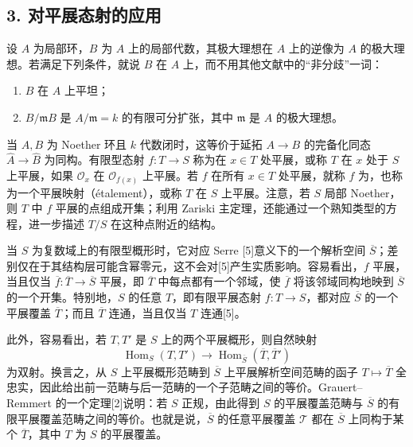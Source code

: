 \subsection*{3. 对平展态射的应用}
设 $A$ 为局部环，$B$ 为 $A$ 上的局部代数，其极大理想在 $A$ 上的逆像为 $A$ 的极大理想。若满足下列条件，就说 $B$ 在 $A$ 上，而不用其他文献中的“非分歧”一词：
\begin{enumerate}[label=(\roman*)]
\item $B$ 在 $A$ 上平坦；
\item $B/\mathfrak mB$ 是 $A/\mathfrak m=k$ 的有限可分扩张，其中 $\mathfrak m$ 是 $A$ 的极大理想。
\end{enumerate}
当 $A,B$ 为 Noether 环且 $k$ 代数闭时，这等价于延拓 $A\to B$ 的完备化同态 $\widehat A\to\widehat B$ 为同构。有限型态射 $f:T\to S$ 称为在 $x\in T$ 处平展，或称 $T$ 在 $x$ 处于 $S$ 上平展，如果 $\mathcal O_x$ 在 $\mathcal O_{f(x)}$ 上平展。若 $f$ 在所有 $x\in T$ 处平展，就称 $f$ 为，也称为一个平展映射（étalement），或称 $T$ 在 $S$ 上平展。注意，若 $S$ 局部 Noether，则 $T$ 中 $f$ 平展的点组成开集；利用 Zariski 主定理，还能通过一个熟知类型的方程，进一步描述 $T/S$ 在这种点附近的结构。

当 $S$ 为复数域上的有限型概形时，它对应 Serre [5]意义下的一个解析空间 $\overline S$；差别仅在于其结构层可能含幂零元，这不会对[5]产生实质影响。容易看出，$f$ 平展，当且仅当 $\overline f:\overline T\to\overline S$ 平展，即 $\overline T$ 中每点都有一个邻域，使 $\overline f$ 将该邻域同构地映到 $\overline S$ 的一个开集。特别地，$S$ 的任意 $T$，即有限平展态射 $f:T\to S$，都对应 $\overline S$ 的一个平展覆盖 $\overline T$；而且 $\overline T$ 连通，当且仅当 $T$ 连通[5]。

此外，容易看出，若 $T,T'$ 是 $S$ 上的两个平展概形，则自然映射
\[
\operatorname{Hom}_S(T,T')\longrightarrow
\operatorname{Hom}_{\overline S}(\overline T,\overline T')
\]
为双射。换言之，从 $S$ 上平展概形范畴到 $\overline S$ 上平展解析空间范畴的函子 $T\mapsto\overline T$ 全忠实，因此给出前一范畴与后一范畴的一个子范畴之间的等价。Grauert--Remmert 的一个定理[2]说明：若 $S$ 正规，由此得到 $S$ 的平展覆盖范畴与 $\overline S$ 的有限平展覆盖范畴之间的等价。也就是说，$\overline S$ 的任意平展覆盖 $\mathcal T$ 都在 $\overline S$ 上同构于某个 $\overline T$，其中 $T$ 为 $S$ 的平展覆盖。

